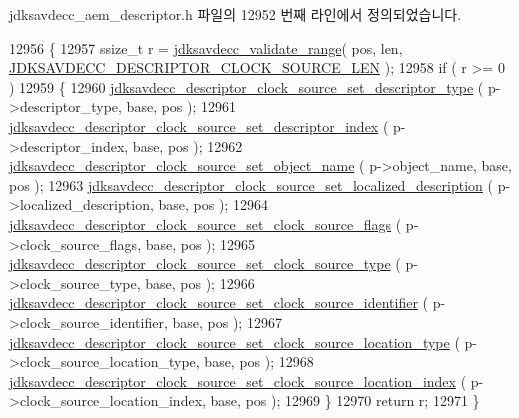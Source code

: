 jdksavdecc\+\_\+aem\+\_\+descriptor.\+h 파일의 12952 번째 라인에서 정의되었습니다.


\begin{DoxyCode}
12956 \{
12957     ssize\_t r = \hyperlink{group__util_ga9c02bdfe76c69163647c3196db7a73a1}{jdksavdecc\_validate\_range}( pos, len, 
      \hyperlink{group__descriptor__clock__source_ga66ee17894f56080a6071a858519f83cd}{JDKSAVDECC\_DESCRIPTOR\_CLOCK\_SOURCE\_LEN} );
12958     \textcolor{keywordflow}{if} ( r >= 0 )
12959     \{
12960         \hyperlink{group__descriptor__clock__source_gadcd251411481a9b091f8ef48cd421212}{jdksavdecc\_descriptor\_clock\_source\_set\_descriptor\_type}
      ( p->descriptor\_type, base, pos );
12961         \hyperlink{group__descriptor__clock__source_ga648147aa20532f66bb9c71af6f68d515}{jdksavdecc\_descriptor\_clock\_source\_set\_descriptor\_index}
      ( p->descriptor\_index, base, pos );
12962         \hyperlink{group__descriptor__clock__source_gae3b1d7c700771e3bd3534af50808ad9f}{jdksavdecc\_descriptor\_clock\_source\_set\_object\_name}
      ( p->object\_name, base, pos );
12963         \hyperlink{group__descriptor__clock__source_gaf5c113a55cc5fcdc8db25b91bd9a0b75}{jdksavdecc\_descriptor\_clock\_source\_set\_localized\_description}
      ( p->localized\_description, base, pos );
12964         \hyperlink{group__descriptor__clock__source_ga0b8b7fe48eab69885a139bedad1ebc1f}{jdksavdecc\_descriptor\_clock\_source\_set\_clock\_source\_flags}
      ( p->clock\_source\_flags, base, pos );
12965         \hyperlink{group__descriptor__clock__source_ga4b0887f88881bcb2dbd7c3704e3ba877}{jdksavdecc\_descriptor\_clock\_source\_set\_clock\_source\_type}
      ( p->clock\_source\_type, base, pos );
12966         \hyperlink{group__descriptor__clock__source_ga815b6fc07de404da79ad7ba9239ab8a4}{jdksavdecc\_descriptor\_clock\_source\_set\_clock\_source\_identifier}
      ( p->clock\_source\_identifier, base, pos );
12967         \hyperlink{group__descriptor__clock__source_ga18a32732cbc18f6b99c0b9d6d3b2785a}{jdksavdecc\_descriptor\_clock\_source\_set\_clock\_source\_location\_type}
      ( p->clock\_source\_location\_type, base, pos );
12968         \hyperlink{group__descriptor__clock__source_ga20cd4817d1ebf40d43d0a6301b59d86a}{jdksavdecc\_descriptor\_clock\_source\_set\_clock\_source\_location\_index}
      ( p->clock\_source\_location\_index, base, pos );
12969     \}
12970     \textcolor{keywordflow}{return} r;
12971 \}
\end{DoxyCode}


